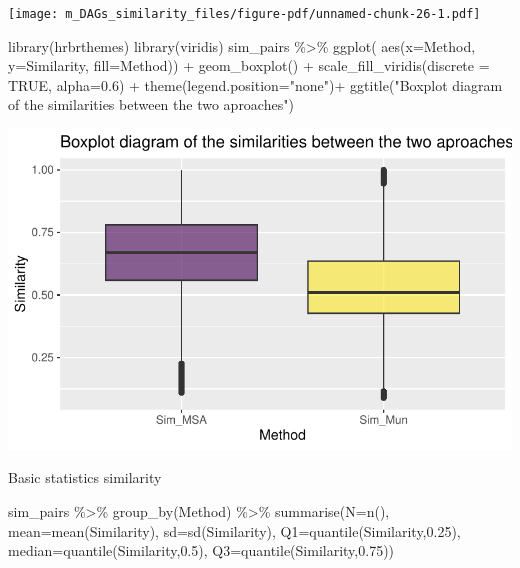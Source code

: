 \documentclass[
  letterpaper,
  DIV=11,
  numbers=noendperiod]{scrreprt}
\newenvironment{Shaded}{}{}
\newcommand{\AttributeTok}[1]{\textcolor[rgb]{0.78,0.47,0.87}{#1}}
\newcommand{\ConstantTok}[1]{\textcolor[rgb]{0.82,0.60,0.40}{#1}}
\newcommand{\FloatTok}[1]{\textcolor[rgb]{0.82,0.60,0.40}{#1}}
\newcommand{\FunctionTok}[1]{\textcolor[rgb]{0.38,0.69,0.94}{#1}}
\newcommand{\NormalTok}[1]{\textcolor[rgb]{0.67,0.70,0.75}{#1}}
\newcommand{\SpecialCharTok}[1]{\textcolor[rgb]{0.34,0.71,0.76}{#1}}
\newcommand{\StringTok}[1]{\textcolor[rgb]{0.60,0.76,0.47}{#1}}
\begin{document}
\texttt{[image: m\_DAGs\_similarity\_files/figure-pdf/unnamed-chunk-26-1.pdf]}

\begin{Shaded}
\begin{Highlighting}[]
\FunctionTok{library}\NormalTok{(hrbrthemes)}
\FunctionTok{library}\NormalTok{(viridis)}
\NormalTok{sim\_pairs }\SpecialCharTok{\%\textgreater{}\%}
  \FunctionTok{ggplot}\NormalTok{( }\FunctionTok{aes}\NormalTok{(}\AttributeTok{x=}\NormalTok{Method, }\AttributeTok{y=}\NormalTok{Similarity, }\AttributeTok{fill=}\NormalTok{Method)) }\SpecialCharTok{+}
  \FunctionTok{geom\_boxplot}\NormalTok{() }\SpecialCharTok{+}
  \FunctionTok{scale\_fill\_viridis}\NormalTok{(}\AttributeTok{discrete =} \ConstantTok{TRUE}\NormalTok{, }\AttributeTok{alpha=}\FloatTok{0.6}\NormalTok{) }\SpecialCharTok{+}
  \FunctionTok{theme}\NormalTok{(}\AttributeTok{legend.position=}\StringTok{"none"}\NormalTok{)}\SpecialCharTok{+}
  \FunctionTok{ggtitle}\NormalTok{(}\StringTok{"Boxplot diagram of the similarities between the two aproaches"}\NormalTok{) }
\end{Highlighting}
\end{Shaded}

\includegraphics[width=1\textwidth,height=\textheight]{m_DAGs_similarity_files/figure-pdf/unnamed-chunk-27-1.pdf}

Basic statistics similarity

\begin{Shaded}
\begin{Highlighting}[]
\NormalTok{sim\_pairs }\SpecialCharTok{\%\textgreater{}\%} \FunctionTok{group\_by}\NormalTok{(Method) }\SpecialCharTok{\%\textgreater{}\%} 
  \FunctionTok{summarise}\NormalTok{(}\AttributeTok{N=}\FunctionTok{n}\NormalTok{(),}
          \AttributeTok{mean=}\FunctionTok{mean}\NormalTok{(Similarity),}
          \AttributeTok{sd=}\FunctionTok{sd}\NormalTok{(Similarity),}
          \AttributeTok{Q1=}\FunctionTok{quantile}\NormalTok{(Similarity,}\FloatTok{0.25}\NormalTok{),}
          \AttributeTok{median=}\FunctionTok{quantile}\NormalTok{(Similarity,}\FloatTok{0.5}\NormalTok{),}
          \AttributeTok{Q3=}\FunctionTok{quantile}\NormalTok{(Similarity,}\FloatTok{0.75}\NormalTok{))}
\end{Highlighting}
\end{Shaded}
\end{document}
